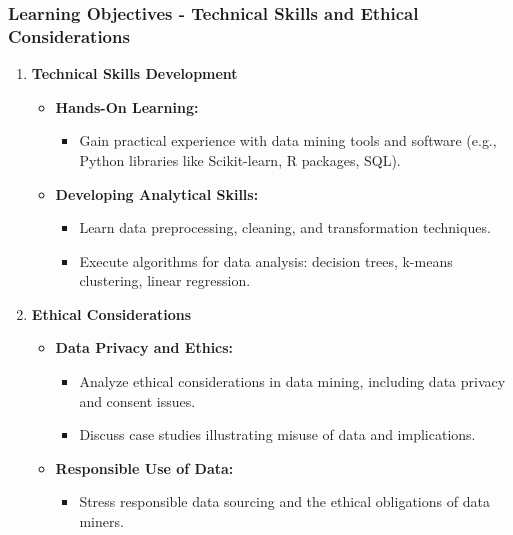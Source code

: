 \documentclass[aspectratio=169]{beamer}
\begin{document}
\begin{frame}[fragile]
    \frametitle{Learning Objectives - Technical Skills and Ethical Considerations}
    \begin{enumerate}
        \item \textbf{Technical Skills Development}
        \begin{itemize}
            \item \textbf{Hands-On Learning:}
            \begin{itemize}
                \item Gain practical experience with data mining tools and software (e.g., Python libraries like Scikit-learn, R packages, SQL).
            \end{itemize}
            \item \textbf{Developing Analytical Skills:}
            \begin{itemize}
                \item Learn data preprocessing, cleaning, and transformation techniques.
                \item Execute algorithms for data analysis: decision trees, k-means clustering, linear regression.
            \end{itemize}
        \end{itemize}
        
        \item \textbf{Ethical Considerations}
        \begin{itemize}
            \item \textbf{Data Privacy and Ethics:}
            \begin{itemize}
                \item Analyze ethical considerations in data mining, including data privacy and consent issues.
                \item Discuss case studies illustrating misuse of data and implications.
            \end{itemize}
            \item \textbf{Responsible Use of Data:}
            \begin{itemize}
                \item Stress responsible data sourcing and the ethical obligations of data miners.
            \end{itemize}
        \end{itemize}
    \end{enumerate}
\end{frame}
\end{document}
